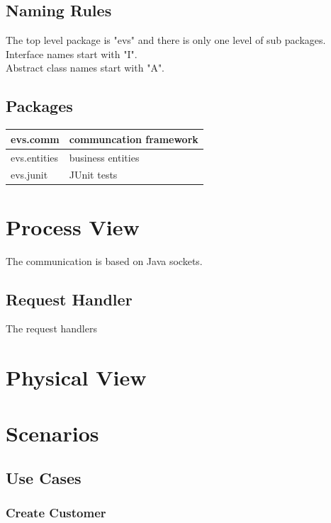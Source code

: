 \documentclass[a4paper]{article}
\begin{document}
\subsection{Naming Rules}

The top level package is "evs" and there is only one level of sub packages.\\
Interface names start with "I".\\
Abstract class names start with "A".\\

\subsection{Packages}

	\begin{tabular}{|l|l|}
	\hline
	evs.comm & communcation framework\\
	\hline
	evs.entities & business entities\\
	\hline
	evs.junit & JUnit tests\\
	\hline
	\end{tabular}

\section{Process View}

The communication is based on Java sockets.

\subsection{Request Handler}

The request handlers 

\section{Physical View}

\section{Scenarios}

\subsection{Use Cases}

\subsubsection{Create Customer}
\end{document}
